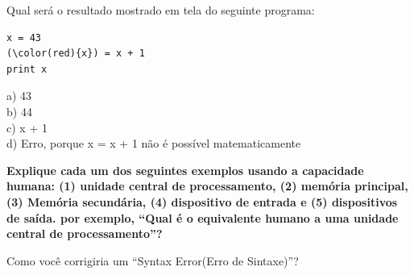 \begin{ex}
Qual será o resultado mostrado em tela do seguinte programa:


\begin{Verbatim}
x = 43
(\color(red){x}) = x + 1
print x
\end{Verbatim}

%
\noindent  a) 43\\
b) 44\\
c) x + 1\\
d) Erro, porque x = x + 1 não é possível matematicamente
\end{ex}

\begin{ex}
\textbf{Explique cada um dos seguintes exemplos usando a capacidade humana: 
(1) unidade central de processamento, (2) memória principal, (3) Memória secundária, 
(4) dispositivo de entrada e (5) dispositivos de saída.
por exemplo, ``Qual é o equivalente humano a uma unidade central de processamento''? }
\end{ex}

\begin{ex}
Como você corrigiria um ``Syntax Error(Erro de Sintaxe)''?
\end{ex}

